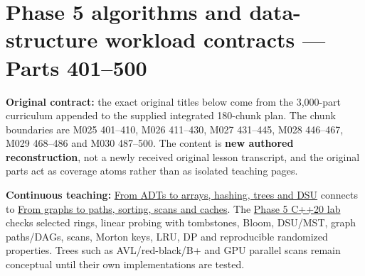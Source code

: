 \section{Phase 5 algorithms and data-structure workload contracts --- Parts 401--500}\label{appendix-fd090d982a15-phase-5-algorithms-and-data-structure-workload-contracts-parts-401500}

\textbf{Original contract:} the exact original titles below come from the 3,000-part curriculum appended to the supplied integrated 180-chunk plan. The chunk boundaries are M025 401--410, M026 411--430, M027 431--445, M028 446--467, M029 468--486 and M030 487--500. The content is \textbf{new authored reconstruction}, not a newly received original lesson transcript, and the original parts act as coverage atoms rather than as isolated teaching pages.

\textbf{Continuous teaching:} \href{Continuous\%20Notes/Computing\%20Foundations\%20-\%20From\%20Bits\%20to\%20C++\%20and\%20Systems\%20APIs\#The\%20scene\%20is\%20now\%20too\%20large\%20for\%20the\%20wrong\%20container\%20—\%20Phase\%205,\%20M025–M027,\%20Parts\%20401–445}{From ADTs to arrays, hashing, trees and DSU} connects to \href{Continuous\%20Notes/Computing\%20Foundations\%20-\%20From\%20Bits\%20to\%20C++\%20and\%20Systems\%20APIs\#From\%20an\%20asset\%20map\%20to\%20a\%20correct\%20navigable\%20world\%20—\%20Phase\%205,\%20M028–M030,\%20Parts\%20446–500}{From graphs to paths, sorting, scans and caches}. The \href{tools/labs/phase5_algorithm_workload_lab.cpp}{Phase 5 C++20 lab} checks selected rings, linear probing with tombstones, Bloom, DSU/MST, graph paths/DAGs, scans, Morton keys, LRU, DP and reproducible randomized properties. Trees such as AVL/red-black/B+ and GPU parallel scans remain conceptual until their own implementations are tested.

